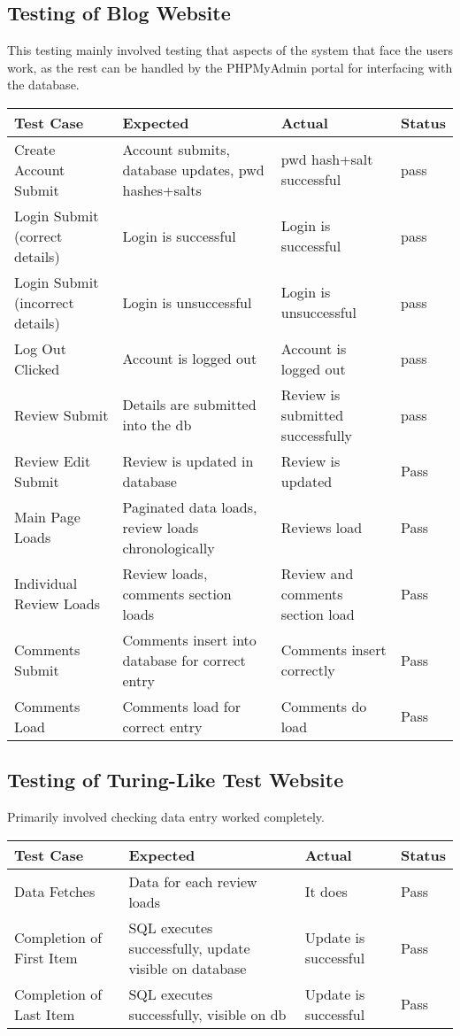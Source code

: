 \subsection{Testing of Blog Website}
This testing mainly involved testing that aspects of the system that face the users work, as the rest can be handled by the PHPMyAdmin portal for interfacing with the database.
\begin{center}
	\begin{tabular}{||m{15em} m{10em} m{10em} m{4em}||} 
		\hline
		Test Case & Expected & Actual & Status \\ [0.5ex] 
		\hline\hline
		Create Account Submit& Account submits, database updates, pwd hashes+salts& pwd hash+salt successful& pass\\
		\hline
		Login Submit (correct details)&Login is successful&Login is successful& pass\\
		\hline
		Login Submit (incorrect details)&Login is unsuccessful&Login is unsuccessful& pass\\
		\hline
		Log Out Clicked&Account is logged out&Account is logged out&pass\\
		\hline
		Review Submit&Details are submitted into the db&Review is submitted successfully& pass\\
		\hline
		Review Edit Submit&Review is updated in database&Review is updated& Pass\\
		\hline
		Main Page Loads&Paginated data loads, review loads chronologically&Reviews load& Pass\\
		\hline
		Individual Review Loads&Review loads, comments section loads& Review and comments section load& Pass\\
		\hline
		Comments Submit&Comments insert into database for correct entry&Comments insert correctly&Pass\\
		\hline
		Comments Load&Comments load for correct entry& Comments do load& Pass\\ [1ex]
		\hline
	\end{tabular}
\end{center}


\subsection{Testing of Turing-Like Test Website}
Primarily involved checking data entry worked completely.

\begin{center}
	\begin{tabular}{||m{15em} m{10em} m{10em} m{4em}||} 
		\hline
		Test Case & Expected & Actual & Status \\ [0.5ex] 
		\hline\hline
		Data Fetches& Data for each review loads& It does& Pass\\
		\hline
		Completion of First Item&SQL executes successfully, update visible on database& Update is successful& Pass\\
		\hline
		Completion of Last Item&SQL executes successfully, visible on db& Update is successful& Pass\\ [1ex] 
		\hline
	\end{tabular}
\end{center}

